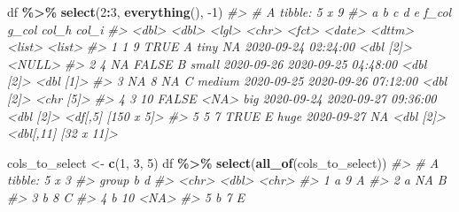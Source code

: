 \documentclass[
]{report}
\newenvironment{Shaded}{\begin{snugshade}}{\end{snugshade}}
\newcommand{\CommentTok}[1]{\textcolor[rgb]{0.56,0.35,0.01}{\textit{#1}}}
\newcommand{\DecValTok}[1]{\textcolor[rgb]{0.00,0.00,0.81}{#1}}
\newcommand{\KeywordTok}[1]{\textcolor[rgb]{0.13,0.29,0.53}{\textbf{#1}}}
\newcommand{\NormalTok}[1]{#1}
\newcommand{\OperatorTok}[1]{\textcolor[rgb]{0.81,0.36,0.00}{\textbf{#1}}}
\newcommand{\StringTok}[1]{\textcolor[rgb]{0.31,0.60,0.02}{#1}}
\begin{document}
\begin{Shaded}
\begin{Highlighting}[]
\NormalTok{df }\OperatorTok{\%\textgreater{}\%}
\StringTok{  }\KeywordTok{select}\NormalTok{(}\DecValTok{2}\OperatorTok{:}\DecValTok{3}\NormalTok{, }\KeywordTok{everything}\NormalTok{(), }\DecValTok{{-}1}\NormalTok{)}
\CommentTok{\#\textgreater{} \# A tibble: 5 x 9}
\CommentTok{\#\textgreater{}       a     b c     d     e      f\_col      g\_col               col\_h     col\_i               }
\CommentTok{\#\textgreater{}   \textless{}dbl\textgreater{} \textless{}dbl\textgreater{} \textless{}lgl\textgreater{} \textless{}chr\textgreater{} \textless{}fct\textgreater{}  \textless{}date\textgreater{}     \textless{}dttm\textgreater{}              \textless{}list\textgreater{}    \textless{}list\textgreater{}              }
\CommentTok{\#\textgreater{} 1     1     9 TRUE  A     tiny   NA         2020{-}09{-}24 02:24:00 \textless{}dbl [2]\textgreater{} \textless{}NULL\textgreater{}              }
\CommentTok{\#\textgreater{} 2     4    NA FALSE B     small  2020{-}09{-}26 2020{-}09{-}25 04:48:00 \textless{}dbl [2]\textgreater{} \textless{}dbl [1]\textgreater{}           }
\CommentTok{\#\textgreater{} 3    NA     8 NA    C     medium 2020{-}09{-}25 2020{-}09{-}26 07:12:00 \textless{}dbl [2]\textgreater{} \textless{}chr [5]\textgreater{}           }
\CommentTok{\#\textgreater{} 4     3    10 FALSE \textless{}NA\textgreater{}  big    2020{-}09{-}24 2020{-}09{-}27 09:36:00 \textless{}dbl [2]\textgreater{} \textless{}df[,5] [150 x 5]\textgreater{}  }
\CommentTok{\#\textgreater{} 5     5     7 TRUE  E     huge   2020{-}09{-}27 NA                  \textless{}dbl [2]\textgreater{} \textless{}dbl[,11] [32 x 11]\textgreater{}}
\end{Highlighting}
\end{Shaded}

\begin{Shaded}
\begin{Highlighting}[]
\NormalTok{cols\_to\_select \textless{}{-}}\StringTok{ }\KeywordTok{c}\NormalTok{(}\DecValTok{1}\NormalTok{, }\DecValTok{3}\NormalTok{, }\DecValTok{5}\NormalTok{)}
\NormalTok{df }\OperatorTok{\%\textgreater{}\%}
\StringTok{  }\KeywordTok{select}\NormalTok{(}\KeywordTok{all\_of}\NormalTok{(cols\_to\_select))}
\CommentTok{\#\textgreater{} \# A tibble: 5 x 3}
\CommentTok{\#\textgreater{}   group     b d    }
\CommentTok{\#\textgreater{}   \textless{}chr\textgreater{} \textless{}dbl\textgreater{} \textless{}chr\textgreater{}}
\CommentTok{\#\textgreater{} 1 a         9 A    }
\CommentTok{\#\textgreater{} 2 a        NA B    }
\CommentTok{\#\textgreater{} 3 b         8 C    }
\CommentTok{\#\textgreater{} 4 b        10 \textless{}NA\textgreater{} }
\CommentTok{\#\textgreater{} 5 b         7 E}
\end{Highlighting}
\end{Shaded}
\end{document}
